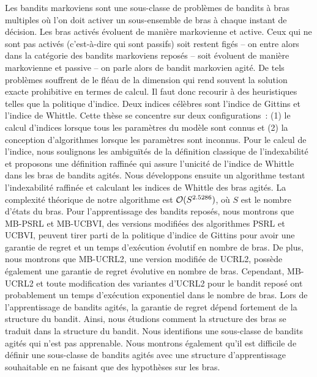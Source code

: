 Les bandits markoviens sont une sous-classe de problèmes de bandits à bras multiples où l'on doit activer un sous-ensemble de bras à chaque instant de décision.
Les bras activés évoluent de manière markovienne et active.
Ceux qui ne sont pas activés (c'est-à-dire qui sont passifs) soit restent figés -- on entre alors dans la catégorie des bandits markoviens reposés -- soit évoluent de manière markovienne et passive – on parle alors de bandit markovien agité.
De tels problèmes souffrent de le fléau de la dimension qui rend souvent la solution exacte prohibitive en termes de calcul.
Il faut donc recourir à des heuristiques telles que la politique d'indice.
Deux indices célèbres sont l'indice de Gittins et l'indice de Whittle.
Cette thèse se concentre sur deux configurations : (1) le calcul d'indices lorsque tous les paramètres du modèle sont connus et (2) la conception d'algorithmes lorsque les paramètres sont inconnus.
Pour le calcul de l'indice, nous soulignons les ambiguïtés de la définition classique de l'indexabilité et proposons une définition raffinée qui assure l'unicité de l'indice de Whittle dans les bras de bandits agités.
Nous développons ensuite un algorithme testant l'indexabilité raffinée et calculant les indices de Whittle des bras agités.
La complexité théorique de notre algorithme est $\mathcal{O}(S^{2.5286})$, où $S$ est le nombre d'états du bras.
Pour l'apprentissage des bandits reposés, nous montrons que MB-PSRL et MB-UCBVI, des versions modifiées des algorithmes PSRL et UCBVI, peuvent tirer parti de la politique d'indice de Gittins pour avoir une garantie de regret et un temps d'exécution évolutif en nombre de bras.
De plus, nous montrons que MB-UCRL2, une version modifiée de UCRL2, possède également une garantie de regret évolutive en nombre de bras.
Cependant, MB-UCRL2 et toute modification des variantes d'UCRL2 pour le bandit reposé ont probablement un temps d'exécution exponentiel dans le nombre de bras. Lors de l'apprentissage de bandits agités, la garantie de regret dépend fortement de la structure du bandit. Ainsi, nous étudions comment la structure des bras se traduit dans la structure du bandit. Nous identifions une sous-classe de bandits agités qui n'est pas apprenable. Nous montrons également qu'il est difficile de définir une sous-classe de bandits agités avec une structure d'apprentissage souhaitable en ne faisant que des hypothèses sur les bras.

